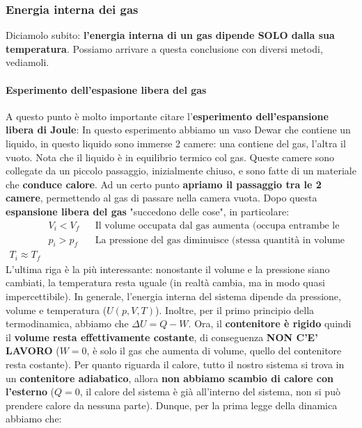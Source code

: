             \subsubsection{Energia interna dei gas}
                Diciamolo subito: \textbf{l'energia interna di un gas dipende SOLO dalla sua temperatura}. Possiamo arrivare a questa conclusione con diversi metodi, vediamoli.
                \paragraph{Esperimento dell'espasione libera del gas}
                    A questo punto è molto importante citare l'\textbf{esperimento dell'espansione libera di Joule}:
                    In questo esperimento abbiamo un vaso Dewar che contiene un liquido, in questo liquido sono immerse 2 camere: una contiene del gas, l'altra il vuoto. Nota che il liquido è in equilibrio termico col gas. Queste camere sono collegate da un piccolo passaggio, inizialmente chiuso, e sono fatte di un materiale che \textbf{conduce calore}. Ad un certo punto \textbf{apriamo il passaggio tra le 2 camere}, permettendo al gas di passare nella camera vuota. Dopo questa \textbf{espansione libera del gas} "succedono delle cose", in particolare:
                    \begin{align*}
                        & V_i < V_f && \textrm{Il volume occupata dal gas aumenta (occupa entrambe le camere)}\\
                        & p_i > p_f && \textrm{La pressione del gas diminuisce (stessa quantità in volume maggiore)}\\
                        T_i \approx T_f
                    \end{align*}
                    L'ultima riga è la più interessante: nonostante il volume e la pressione siano cambiati, la temperatura resta uguale (in realtà cambia, ma in modo quasi impercettibile). In generale, l'energia interna del sistema dipende da pressione, volume e temperatura ($U(p, V, T)$). Inoltre, per il primo principio della termodinamica, abbiamo che $\Delta U = Q - W$. Ora, il \textbf{contenitore è rigido}  quindi il \textbf{volume resta effettivamente costante}, di conseguenza \textbf{NON C'E' LAVORO} ($W=0$, è solo il gas che aumenta di volume, quello del contenitore resta costante). Per quanto riguarda il calore, tutto il nostro sistema si trova in un \textbf{contenitore adiabatico}, allora \textbf{non abbiamo scambio di calore con l'esterno} ($Q=0$, il calore del sistema è già all'interno del sistema, non si può prendere calore da nessuna parte). Dunque, per la prima legge della dinamica abbiamo che:
